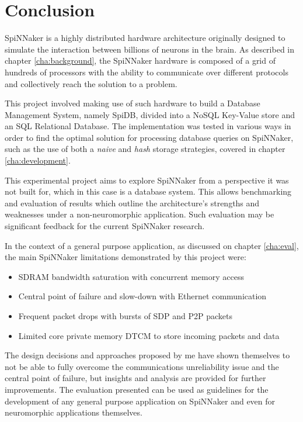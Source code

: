 \chapter{Conclusion}
\label{cha:conclusion}
SpiNNaker is a highly distributed hardware architecture originally designed to simulate the interaction between billions of neurons in the brain. As described in chapter \ref{cha:background}, the SpiNNaker hardware is composed of a grid of hundreds of processors with the ability to communicate over different protocols and collectively reach the solution to a problem.

This project involved making use of such hardware to build a Database Management System, namely SpiDB, divided into a NoSQL Key-Value store and an SQL Relational Database. The implementation was tested in various ways in order to find the optimal solution for processing database queries on SpiNNaker, such as the use of both a \textit{naive} and \textit{hash} storage strategies, covered in chapter \ref{cha:development}.

This experimental project aims to explore SpiNNaker from a perspective it was not built for, which in this case is a database system. This allows benchmarking and evaluation of results which outline the architecture's strengths and weaknesses under a non-neuromorphic application. Such evaluation may be significant feedback for the current SpiNNaker research.

In the context of a general purpose application, as discussed on chapter \ref{cha:eval}, the main SpiNNaker limitations demonstrated by this project were:
\begin{itemize}
\setlength\itemsep{-0.1em}
	\item SDRAM bandwidth saturation with concurrent memory access
	\item Central point of failure and slow-down with Ethernet communication
	\item Frequent packet drops with bursts of SDP and P2P packets
	\item Limited core private memory DTCM to store incoming packets and data
\end{itemize}

The design decisions and approaches proposed by me have shown themselves to not be able to fully overcome the communications unreliability issue and the central point of failure, but insights and analysis are provided for further improvements. The evaluation presented can be used as guidelines for the development of any general purpose application on SpiNNaker and even for neuromorphic applications themselves.


